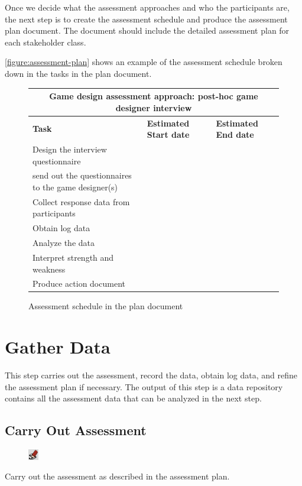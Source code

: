 \documentclass[11pt,oneside]{book}
\newcommand\tabhead[1]{\small\textbf{#1}}
\begin{document}
Once we decide what the assessment approaches and who the participants are, the next step is to create the assessment 
schedule and produce the assessment plan document. The document should include the detailed assessment plan for 
each stakeholder class. 

\autoref{figure:assessment-plan} shows an example of the assessment schedule broken down in the tasks 
in the plan document.

\begin{figure}[ht!]
  \centering
  \begin{tabular}{|p{}|p{}|p{}|}
    \hline
    \multicolumn{3}{|c|}{\tabhead{Game design assessment approach: post-hoc game designer interview}} \\
    \hline
    \tabhead{Task} &
    \tabhead{Estimated Start date} &
    \tabhead{Estimated End date} \\
    \hline
    Design the interview questionnaire & & \\
    \hline
    send out the questionnaires to the game designer(s) & & \\
    \hline
    Collect response data from participants & & \\
    \hline
    Obtain log data & & \\
    \hline
    Analyze the data & & \\
    \hline
    Interpret strength and weakness & & \\
    \hline
    Produce action document & & \\
    \hline
  \end{tabular}
  \caption{Assessment schedule in the plan document}
  \label{figure:assessment-plan}
\end{figure}


\chapter{Gather Data}
This step carries out the assessment, record the data, obtain log data, and refine the assessment plan if necessary. 
The output of this step is a data repository contains all the assessment data that can be analyzed in the next step.

\section{Carry Out Assessment}
\begin{shadebox}
\begin{figure}
\vspace{-15pt}\hspace{-10pt}
    \includegraphics[width=0.04\textwidth]{note-icon}
\end{figure}
Carry out the assessment as described in the assessment plan.
\end{shadebox}
\end{document}
